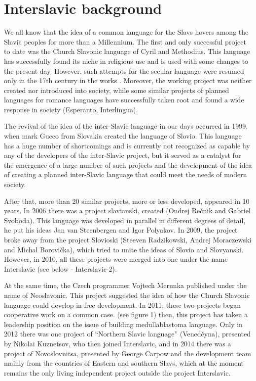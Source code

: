 \section{Interslavic background}

We all know that the idea of a common language for the Slavs hovers among the Slavic peoples for more than a Millennium. The first and only successful project to date was the Church Slavonic language of Cyril and Methodius. This language has successfully found its niche in religious use and is used with some changes to the present day. However, such attempts for the secular language were resumed only in the 17th century in the works \cite{krizhanich} \cite{matija}. Moreover, the working project was neither created nor introduced into society, while some similar projects of planned languages for romance languages have successfully taken root and found a wide response in society (Esperanto, Interlingua).

The revival of the idea of the inter-Slavic language in our days occurred in 1999, when mark Gucco from Slovakia created the language of Slovio. This language has a huge number of shortcomings and is currently not recognized as capable by any of the developers of the inter-Slavic project, but it served as a catalyst for the emergence of a large number of such projects and the development of the idea of creating a planned inter-Slavic language that could meet the needs of modern society. 

After that, more than 20 similar projects, more or less developed, appeared in 10 years. In 2006 there was a project slavianski, created (Ondrej Rečnik and Gabriel Svoboda). This language was developed in parallel in different degrees of detail, he put his ideas Jan van Steenbergen and Igor Polyakov. In 2009, the project broke away from the project Slovioski (Steeven Radzikowski, Andrej Moraczewski and Michal Borovička), which tried to unite the ideas of Slovio and Slovyanski. However, in 2010, all these projects were merged into one under the name Interslavic (see below - Interslavic-2).

At the same time, the Czech programmer Vojtech Merunka published under the name of Neoslavonic. This project suggested the idea of how the Church Slavonic language could develop in free development. In 2011, these two projects began cooperative work on a common case. (see figure 1) then, this project has taken a leadership position on the issue of building medullablastoma language. Only in 2012 there was one project of “Northern Slavic language” (Venedčyna), presented by Nikolai Kuznetsov, who then joined Interslavic, and in 2014 there was a project of Novoslovnitsa, presented by George Carpow and the development team mainly from the countries of Eastern and southern Slavs, which at the moment remains the only living independent project outside the project Interslavic.

